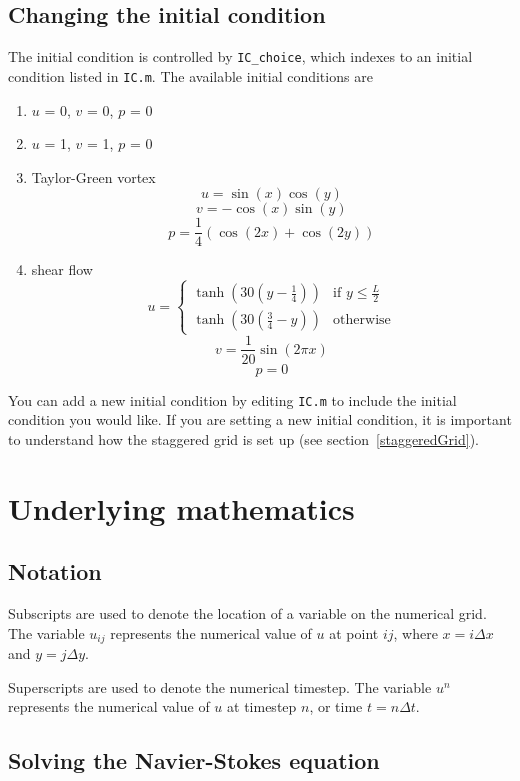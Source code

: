 \documentclass[12pt]{article}
\begin{document}
\subsection{Changing the initial condition}
The initial condition is controlled by \texttt{IC\_choice}, which indexes to an initial condition listed in \texttt{IC.m}.  The available initial conditions are 
\begin{enumerate}
\item $u$ = 0, $v$ = 0, $p$ = 0
\item $u$ = 1, $v$ = 1, $p$ = 0
\item Taylor-Green vortex 
\[ u = \sin(x)\cos(y)\]
\[ v = -\cos(x)\sin(y)\]
\[ p = \frac{1}{4}\left( \cos(2x) + \cos(2y) \right)\]
\item shear flow
\[ u = \begin{cases} \tanh\left(30(y-\frac{1}{4})\right) & \text{if } y \le \frac{L}{2} \\ \tanh\left(30(\frac{3}{4}-y)\right) & \text{otherwise} \end{cases}\]
\[ v = \frac{1}{20}\sin(2\pi x)\]
\[ p = 0\]
\end{enumerate}
You can add a new initial condition by editing \texttt{IC.m} to include the initial condition you would like.  If you are setting a new initial condition, it is important to understand how the staggered grid is set up (see section~\ref{staggeredGrid}).

\section{Underlying mathematics}
\subsection{Notation}
Subscripts are used to denote the location of a variable on the numerical grid.  The variable $u_{ij}$ represents the numerical value of $u$ at point $ij$, where $x=i\Delta x$ and $y=j\Delta y$.

Superscripts are used to denote the numerical timestep.  The variable $u^n$ represents the numerical value of $u$ at timestep $n$, or time $t=n\Delta t$.

\subsection{Solving the Navier-Stokes equation}
\label{mathBasics}
\end{document}

